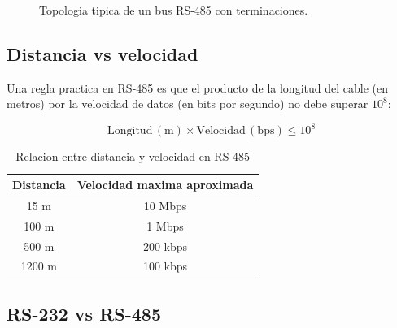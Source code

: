 \begin{figure}[H]
    \centering
    \caption{Topologia tipica de un bus RS-485 con terminaciones.}
    \label{fig:rs485_topologia}
\end{figure}

\subsection{Distancia vs velocidad}

Una regla practica en RS-485 es que el producto de la longitud del cable (en
metros) por la velocidad de datos (en bits por segundo) no debe superar
$10^8$:

\begin{equation}
    \mathrm{Longitud\,(m)} \times \mathrm{Velocidad\,(bps)} \leq 10^8
\end{equation}

\begin{table}[H]
    \centering
    \caption{Relacion entre distancia y velocidad en RS-485}
    \label{tab:rs485_distancia}
    \begin{tabular}{|c|c|}
        \hline
        \textbf{Distancia} & \textbf{Velocidad maxima aproximada} \\
        \hline
        15 m & 10 Mbps \\
        \hline
        100 m & 1 Mbps \\
        \hline
        500 m & 200 kbps \\
        \hline
        1200 m & 100 kbps \\
        \hline
    \end{tabular}
\end{table}

\subsection{RS-232 vs RS-485}

